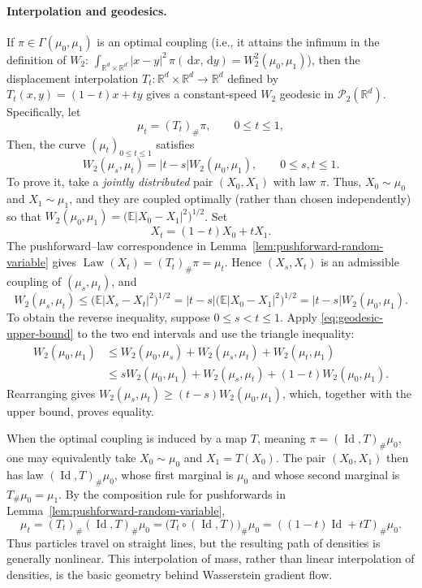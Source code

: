 \documentclass[11pt]{amsart}
\numberwithin{equation}{section}
\theoremstyle{plain}
\newcommand{\R}{\mathbb{R}}
\newcommand{\E}{\mathbb{E}}
\newcommand{\cP}{\mathcal{P}}
\newcommand{\dd}{\,\mathrm{d}}
\newcommand{\abs}[1]{\left\lvert#1\right\rvert}
\DeclareMathOperator{\Law}{Law}
\DeclareMathOperator{\Id}{Id}
\begin{document}
\paragraph{\textbf{Interpolation and geodesics.}}
If $\pi\in \Gamma(\mu_0,\mu_1)$ is an optimal coupling (i.e., it attains the infimum in the definition of $W_2$: $\int_{\R^d\times\R^d}|x-y|^2\,\pi(\dd x,\dd y)
 =W_2^2(\mu_0,\mu_1)$), then the displacement interpolation
$T_t:\R^d\times\R^d\to\R^d$ defined by $T_t(x,y)=(1-t)x+ty$ gives a constant-speed $W_2$ geodesic in $\cP_2(\R^d)$. Specifically, let
\begin{equation}\label{eq:displacement-interpolation}
 \mu_t=(T_t)_\#\pi,
 \qquad 0\leq t\leq1,
\end{equation}
Then, the curve $(\mu_t)_{0\leq t\leq1}$ satisfies
\[
 W_2(\mu_s,\mu_t)=|t-s|W_2(\mu_0,\mu_1),
 \qquad 0\leq s,t\leq1.
\]
To prove it, take a \emph{jointly distributed}
pair $(X_0,X_1)$ with law $\pi$. Thus, $X_0\sim\mu_0$ and
$X_1\sim\mu_1$, and they are coupled optimally (rather than chosen
independently) so that $W_2(\mu_0,\mu_1)=\bigl(\E\abs{X_0-X_1}^2\bigr)^{1/2}$.  Set
\[
 X_t=(1-t)X_0+tX_1.
\]
The pushforward--law correspondence in
Lemma~\ref{lem:pushforward-random-variable} gives
$\Law(X_t)=(T_t)_\#\pi=\mu_t$.  Hence $(X_s,X_t)$ is an admissible coupling
of $(\mu_s,\mu_t)$, and
\begin{equation}\label{eq:geodesic-upper-bound}
 W_2(\mu_s,\mu_t)
 \leq\bigl(\E\abs{X_s-X_t}^2\bigr)^{1/2} = |t-s| \bigl(\E\abs{X_0-X_1}^2\bigr)^{1/2}
 =\abs{t-s}W_2(\mu_0,\mu_1).
\end{equation}
To obtain the reverse inequality, suppose $0\leq s<t\leq1$.  Apply
\eqref{eq:geodesic-upper-bound} to the two end intervals and use the triangle
inequality:
\begin{align*}
 W_2(\mu_0,\mu_1)
 &\leq W_2(\mu_0,\mu_s)+W_2(\mu_s,\mu_t)
       +W_2(\mu_t,\mu_1)\\
 &\leq sW_2(\mu_0,\mu_1)+W_2(\mu_s,\mu_t)
       +(1-t)W_2(\mu_0,\mu_1).
\end{align*}
Rearranging gives
$W_2(\mu_s,\mu_t)\geq(t-s)W_2(\mu_0,\mu_1)$, which, together with the
upper bound, proves equality.

When the optimal coupling is induced by
a map $T$, meaning $\pi=(\Id,T)_\#\mu_0$, one may equivalently take
$X_0\sim\mu_0$ and $X_1=T(X_0)$.  The pair $(X_0,X_1)$ then has law
$(\Id,T)_\#\mu_0$, whose first marginal is $\mu_0$ and whose second marginal
is $T_\#\mu_0=\mu_1$.  By the composition rule for pushforwards in
Lemma~\ref{lem:pushforward-random-variable},
\[
 \mu_t=(T_t)_\#(\Id,T)_\#\mu_0
 =\bigl(T_t\circ(\Id,T)\bigr)_\#\mu_0
 =((1-t)\Id+tT)_\#\mu_0.
\]
Thus particles travel on straight lines, but the
resulting path of densities is generally nonlinear.  This interpolation of
mass, rather than linear interpolation of densities, is the basic geometry
behind Wasserstein gradient flow.
\end{document}
